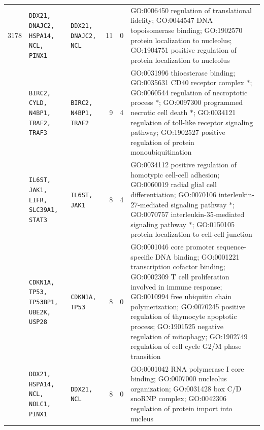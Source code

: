 \begin{table}[!htbp]
{\begin{tabular}{r p{} p{} r r p{}}
3178 & \texttt{DDX21, DNAJC2, HSPA14, NCL, PINX1} & \texttt{DDX21, DNAJC2, NCL} & 11 & 0 & GO:0006450 regulation of translational fidelity; GO:0044547 DNA topoisomerase binding; GO:1902570 protein localization to nucleolus; GO:1904751 positive regulation of protein localization to nucleolus \\
\addlinespace
4091 & \texttt{BIRC2, CYLD, N4BP1, TRAF2, TRAF3} & \texttt{BIRC2, N4BP1, TRAF2} & 9 & 4 & GO:0031996 thioesterase binding; GO:0035631 CD40 receptor complex $\ast$; GO:0060544 regulation of necroptotic process $\ast$; GO:0097300 programmed necrotic cell death $\ast$; GO:0034121 regulation of toll-like receptor signaling pathway; GO:1902527 positive regulation of protein monoubiquitination \\
\addlinespace
3710 & \texttt{IL6ST, JAK1, LIFR, SLC39A1, STAT3} & \texttt{IL6ST, JAK1} & 8 & 4 & GO:0034112 positive regulation of homotypic cell-cell adhesion; GO:0060019 radial glial cell differentiation; GO:0070106 interleukin-27-mediated signaling pathway $\ast$; GO:0070757 interleukin-35-mediated signaling pathway $\ast$; GO:0150105 protein localization to cell-cell junction \\
\addlinespace
5036 & \texttt{CDKN1A, TP53, TP53BP1, UBE2K, USP28} & \texttt{CDKN1A, TP53} & 8 & 0 & GO:0001046 core promoter sequence-specific DNA binding; GO:0001221 transcription cofactor binding; GO:0002309 T cell proliferation involved in immune response; GO:0010994 free ubiquitin chain polymerization; GO:0070245 positive regulation of thymocyte apoptotic process; GO:1901525 negative regulation of mitophagy; GO:1902749 regulation of cell cycle G2/M phase transition \\
\addlinespace
4150 & \texttt{DDX21, HSPA14, NCL, NOLC1, PINX1} & \texttt{DDX21, NCL} & 8 & 0 & GO:0001042 RNA polymerase I core binding; GO:0007000 nucleolus organization; GO:0031428 box C/D snoRNP complex; GO:0042306 regulation of protein import into nucleus \\
\bottomrule
\end{tabular}}
\end{table}